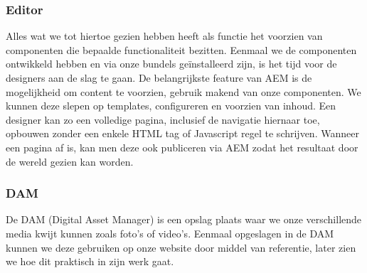 \documentclass{article}
\begin{document}
	\subsubsection{Editor}
	Alles wat we tot hiertoe gezien hebben heeft als functie het voorzien van componenten die bepaalde functionaliteit bezitten. Eenmaal we de componenten ontwikkeld hebben en via onze bundels ge\"installeerd zijn, is het tijd voor de designers aan de slag te gaan. De belangrijkste feature van AEM is de mogelijkheid om content te voorzien, gebruik makend van onze componenten. We kunnen deze slepen op templates, configureren en voorzien van inhoud. Een designer kan zo een volledige pagina, inclusief de navigatie hiernaar toe, opbouwen zonder een enkele HTML tag of Javascript regel te schrijven. Wanneer een pagina af is, kan men deze ook publiceren via AEM zodat het resultaat door de wereld gezien kan worden.
	\subsubsection{DAM}
	De DAM (Digital Asset Manager) is een opslag plaats waar we onze verschillende media kwijt kunnen zoals foto's of video's. Eenmaal opgeslagen in de DAM kunnen we deze gebruiken op onze website door middel van referentie, later zien we hoe dit praktisch in zijn werk gaat.
\end{document}
